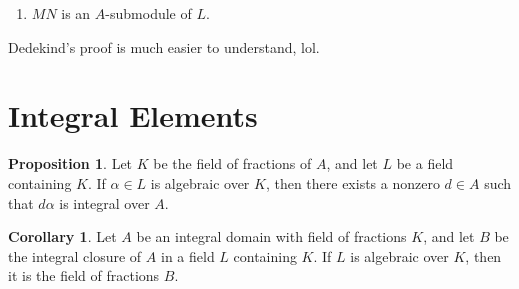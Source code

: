 \documentclass[a4paper]{book}
\theoremstyle{definition}
\newtheorem{corollary}{Corollary}
\newtheorem{proposition}[definition]{Proposition}
\begin{document}
\begin{enumerate}
    \item \(MN\) is an \(A\)-submodule of \(L\).
\end{enumerate}

Dedekind's proof is much easier to understand, lol.


\section*{Integral Elements}

\begin{proposition}
    Let \(K\) be the field of fractions of \(A\), and let \(L\) be a field containing \(K\). If \(\alpha \in L\) is algebraic over \(K\), then there exists a nonzero \(d \in A\) such that \(d \alpha \) is integral over \(A\).
\end{proposition}

\begin{corollary}
    Let \(A\) be an integral domain with field of fractions \(K\), and let \(B\) be the integral closure of \(A\) in a field \(L\) containing \(K\). If \(L\) is algebraic over \(K\), then it is the field of fractions \(B\).
\end{corollary}
\end{document}
